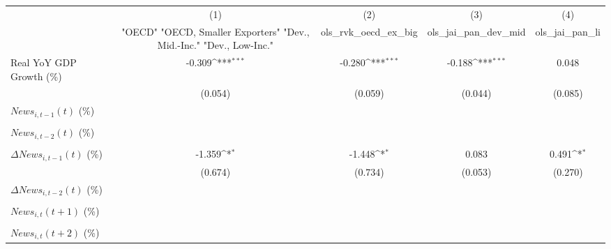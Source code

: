{
\def\sym#1{\ifmmode^{#1}\else\(^{#1}\)\fi}
\begin{tabular}{l*{4}{c}}
\toprule
                    &\multicolumn{1}{c}{(1)}&\multicolumn{1}{c}{(2)}&\multicolumn{1}{c}{(3)}&\multicolumn{1}{c}{(4)}\\
                    &\multicolumn{1}{c}{ "OECD" "OECD, Smaller Exporters" "Dev., Mid.-Inc." "Dev., Low-Inc."}&\multicolumn{1}{c}{ols_rvk_oecd_ex_big}&\multicolumn{1}{c}{ols_jai_pan_dev_mid}&\multicolumn{1}{c}{ols_jai_pan_li}\\
\midrule
Real YoY GDP Growth (\%)&      -0.309\sym{***}&      -0.280\sym{***}&      -0.188\sym{***}&       0.048         \\
                    &     (0.054)         &     (0.059)         &     (0.044)         &     (0.085)         \\
\addlinespace
$ News_{i,t-1}(t)$ (\%)&                     &                     &                     &                     \\
                    &                     &                     &                     &                     \\
\addlinespace
$ News_{i,t-2}(t)$ (\%)&                     &                     &                     &                     \\
                    &                     &                     &                     &                     \\
\addlinespace
$ \Delta News_{i,t-1}(t)$ (\%)&      -1.359\sym{*}  &      -1.448\sym{*}  &       0.083         &       0.491\sym{*}  \\
                    &     (0.674)         &     (0.734)         &     (0.053)         &     (0.270)         \\
\addlinespace
$ \Delta News_{i,t-2}(t)$ (\%)&                     &                     &                     &                     \\
                    &                     &                     &                     &                     \\
\addlinespace
$ News_{i,t}(t+1)$ (\%)&                     &                     &                     &                     \\
                    &                     &                     &                     &                     \\
\addlinespace
$ News_{i,t}(t+2)$ (\%)&                     &                     &                     &                     \\

\end{tabular}}
